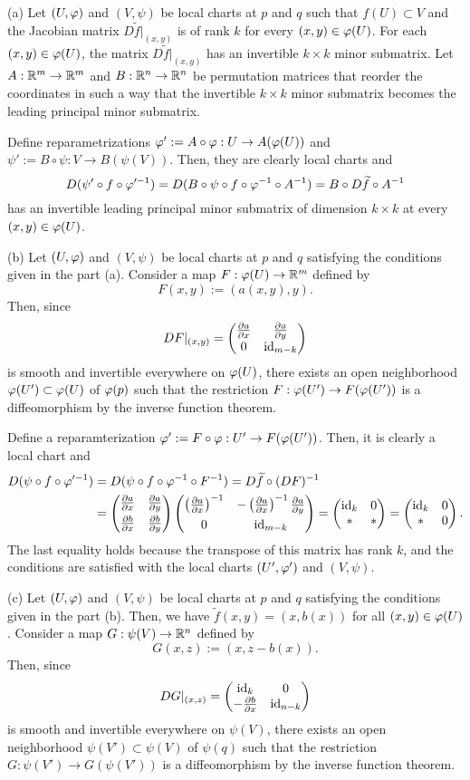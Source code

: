 \documentclass{../note}
\begin{document}
\begin{pf}
(a)
Let $(U,\varphi)$ and $(V,\psi)$ be local charts at $p$ and $q$ such that $f(U)\subset V$ and the Jacobian matrix $D\tilde f|_{(x,y)}$ is of rank $k$ for every $(x,y)\in\varphi(U)$.
For each $(x,y)\in\varphi(U)$, the matrix $D\tilde f|_{(x,y)}$ has an invertible $k\times k$ minor submatrix.
Let $A:\mathbb{R}^m\to\mathbb{R}^m$ and $B:\mathbb{R}^n\to\mathbb{R}^n$ be permutation matrices that reorder the coordinates in such a way that the invertible $k\times k$ minor submatrix becomes the leading principal minor submatrix.

Define reparametrizations $\varphi':=A\circ\varphi:U\to A(\varphi(U))$ and $\psi':=B\circ\psi:V\to B(\psi(V))$.
Then, they are clearly local charts and
\[D(\psi'\circ f\circ\varphi'^{-1})=D(B\circ\psi\circ f\circ\varphi^{-1}\circ A^{-1})=B\circ D\widetilde f\circ A^{-1}\]
has an invertible leading principal minor submatrix of dimension $k\times k$ at every $(x,y)\in\varphi(U)$.

(b)
Let $(U,\varphi)$ and $(V,\psi)$ be local charts at $p$ and $q$ satisfying the conditions given in the part (a).
Consider a map $F:\varphi(U)\to\mathbb{R}^m$ defined by
\[F(x,y):=(a(x,y),y).\]
Then, since
\[DF|_{(x,y)}=\mat{\pd{a}{x}&\pd{a}{y}\\0&\id_{m-k}}\]
is smooth and invertible everywhere on $\varphi(U)$, there exists an open neighborhood $\varphi(U')\subset\varphi(U)$ of $\varphi(p)$ such that the restriction $F:\varphi(U')\to F(\varphi(U'))$ is a diffeomorphism by the inverse function theorem.

Define a reparamterization $\varphi':=F\circ\varphi:U'\to F(\varphi(U'))$.
Then, it is clearly a local chart and
\begin{align*}
D(\psi\circ f\circ\f'^{-1})
&=D(\psi\circ f\circ\f^{-1}\circ F^{-1})
=D\tilde f\circ(DF)^{-1}\\
&=\mat{\pd{a}{x}&\pd{a}{y}\\[4pt]\pd{b}{x}&\pd{b}{y}}\mat{\left(\pd{a}{x}\right)^{-1}&-\left(\pd{a}{x}\right)^{-1}\pd{a}{y}\\[4pt]0&\id_{m-k}}
=\mat{\id_k&0\\\ast&\ast}=\mat{\id_k&0\\\ast&0}.
\end{align*}
The last equality holds because the transpose of this matrix has rank $k$, and the conditions are satisfied with the local charts $(U',\varphi')$ and $(V,\psi)$.

(c)
Let $(U,\varphi)$ and $(V,\psi)$ be local charts at $p$ and $q$ satisfying the conditions given in the part (b).
Then, we have $\tilde f(x,y)=(x,b(x))$ for all $(x,y)\in\varphi(U)$.
Consider a map $G:\psi(V)\to\mathbb{R}^n$ defined by
\[G(x,z):=(x,z-b(x)).\]
Then, since
\[DG|_{(x,z)}=\mat{\id_k&0\\-\pd{b}{x}&\id_{n-k}}\]
is smooth and invertible everywhere on $\psi(V)$, there exists an open neighborhood $\psi(V')\subset\psi(V)$ of $\psi(q)$ such that the restriction $G:\psi(V')\to G(\psi(V'))$ is a diffeomorphism by the inverse function theorem.


\end{pf}
\end{document}
